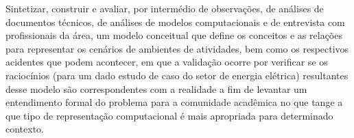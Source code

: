 Sintetizar, construir e avaliar, por intermédio de observações, de análises de documentos técnicos, de análises de modelos computacionais e de entrevista com profissionais da área, um modelo conceitual que define os conceitos e as relações para representar os cenários de ambientes de atividades, bem como os respectivos acidentes que podem acontecer, em que a validação ocorre por verificar se os raciocínios (para um dado estudo de caso do setor de energia elétrica) resultantes desse modelo são correspondentes com a realidade a fim de levantar um entendimento formal do problema para a comunidade acadêmica no que tange a que tipo de representação computacional é mais apropriada para determinado contexto. 